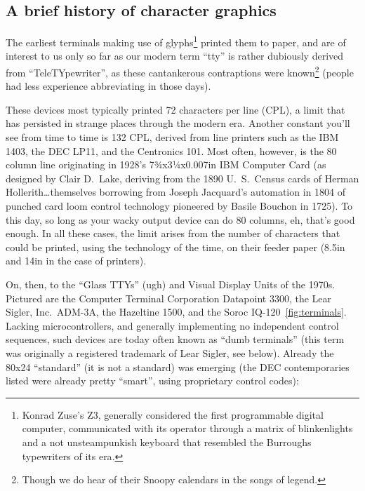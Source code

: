 \documentclass[letterpaper,10pt]{article}
\begin{document}
\begin{appendices}
\section{A brief history of character graphics}
\label{sec:terminals}
The earliest terminals making use of glyphs\footnote{Konrad Zuse's Z3, generally
 considered the first programmable digital computer, communicated with its
operator through a matrix of blinkenlights and a not unsteampunkish keyboard that resembled the
Burroughs typewriters of its era\cite{zuse}.} printed them to paper, and are of
interest to us only so far as our modern term ``tty'' is rather dubiously
derived from ``TeleTYpewriter'', as these cantankerous contraptions were
known\footnote{Though we do hear of their Snoopy calendars in the songs of
legend\cite{quiche}.} (people had less experience abbreviating in those days).

These devices most typically printed 72 characters per line (CPL), a limit that
has persisted in strange places\cite{pandoc} through the modern era. Another constant
you'll see from time to time is 132 CPL, derived from line printers such as the
IBM 1403, the DEC LP11, and the Centronics 101\cite{ibm1403}. Most often,
however, is the 80 column line originating in 1928's 7¾x3¼x0.007in IBM
Computer Card (as designed by Clair D.\ Lake, deriving from the 1890 U.\ S.\
Census cards of Herman Hollerith\ldots themselves borrowing from Joseph
Jacquard's automation in 1804 of punched card loom control technology pioneered
by Basile Bouchon in 1725\cite{cards}). To this day, so long as your wacky
output device can do 80 columns, eh, that's good enough. In all these cases,
the limit arises from the number of characters that could be printed, using the
technology of the time, on their feeder paper (8.5in and 14in in the case of
printers).

On, then, to the ``Glass TTYs'' (ugh) and Visual Display Units of the 1970s.
Pictured are the Computer Terminal Corporation Datapoint 3300, the
Lear Sigler, Inc.\ ADM-3A, the Hazeltine 1500, and the Soroc IQ-120~\ref{fig:terminals}.
Lacking microcontrollers, and generally implementing no independent control
sequences, such devices are today often known as ``dumb terminals'' (this term
was originally a registered trademark of Lear Sigler, see below). Already the
80x24 ``standard'' (it is not a standard) was emerging (the DEC contemporaries
listed were already pretty ``smart'', using proprietary control codes):


\end{appendices}
\end{document}
